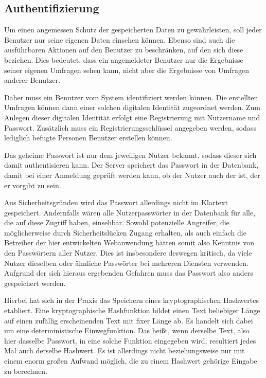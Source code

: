 \subsection{Authentifizierung}
\label{sec:authentifizierung}

Um einen angemessen Schutz der gespeicherten Daten zu gewährleisten, soll jeder Benutzer nur seine eigenen Daten einsehen können.
Ebenso sind auch die ausführbaren Aktionen auf den Benutzer zu beschränken, auf den sich diese beziehen.
Dies bedeutet, dass ein angemeldeter Benutzer nur die Ergebnisse seiner eigenen Umfragen sehen kann, nicht aber die Ergebnisse von Umfragen anderer Benutzer.

Daher muss ein Benutzer vom System identifiziert werden können.
Die erstellten Umfragen können dann einer solchen digitalen Identität zugeordnet werden.
Zum Anlegen dieser digitalen Identität erfolgt eine Registrierung mit Nutzername und Passwort.
Zusätzlich muss ein Registrierungsschlüssel angegeben werden, sodass lediglich befugte Personen Benutzer erstellen können.

Das geheime Passwort ist nur dem jeweiligen Nutzer bekannt, sodass dieser sich damit authentisieren kann.
Der Server speichert das Passwort in der Datenbank, damit bei einer Anmeldung geprüft werden kann, ob der Nutzer auch der ist, der er vorgibt zu sein.

Aus Sicherheitsgründen wird das Passwort allerdings nicht im Klartext gespeichert.
Andernfalls wären alle Nutzerpasswörter in der Datenbank für alle, die auf diese Zugriff haben, einsehbar.
Sowohl potenzielle Angreifer, die möglicherweise durch Sicherheitslücken Zugang erhalten, als auch einfach die Betreiber der hier entwickelten Webanwendung hätten somit also Kenntnis von den Passwörtern aller Nutzer.
Dies ist insbesondere deswegen kritisch, da viele Nutzer dieselben oder ähnliche Passwörter bei mehreren Diensten verwenden.
Aufgrund der sich hieraus ergebenden Gefahren muss das Passwort also anders gespeichert werden.

Hierbei hat sich in der Praxis das Speichern eines kryptographischen Hashwertes etabliert.
Eine kryptographische Hashfunktion bildet einen Text beliebiger Länge auf einen zufällig erscheinenden Text mit fixer Länge ab.
Es handelt sich dabei um eine deterministische Einwegfunktion.
Das heißt, wenn derselbe Text, also hier dasselbe Passwort, in eine solche Funktion eingegeben wird, resultiert jedes Mal auch derselbe Hashwert.
Es ist allerdings nicht beziehungsweise nur mit einem enorm großen Aufwand möglich, die zu einem Hashwert gehörige Eingabe zu berechnen.

